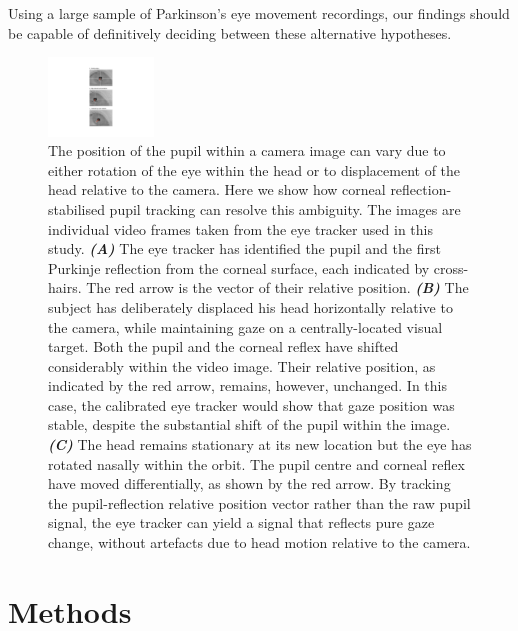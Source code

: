 \documentclass[jou,a4paper]{apa6}
\begin{document}
Using a large sample of Parkinson's eye movement recordings, our findings should be capable of definitively deciding between these alternative hypotheses.

\begin{figure}[htbp]
\begin{center}
\includegraphics [width=0.25\textwidth]{Figures/Figure_1_Explanatory}
\caption{The position of the pupil within a camera image can vary due to either rotation of the eye within the head or to displacement of the head relative to the camera. Here we show how corneal reflection-stabilised pupil tracking can resolve this ambiguity. The images are individual video frames taken from the eye tracker used in this study. \textbf{\textit{(A)}} The eye tracker has identified the pupil and the first Purkinje reflection from the corneal surface, each indicated by cross-hairs. The red arrow is the vector of their relative position. \textbf{\textit{(B)}} The subject has deliberately displaced his head horizontally relative to the camera, while maintaining gaze on a centrally-located visual target. Both the pupil and the corneal reflex have shifted considerably within the video image. Their relative position, as indicated by the red arrow, remains, however, unchanged. In this case, the calibrated eye tracker would show that gaze position was stable, despite the substantial shift of the pupil within the image. \textbf{\textit{(C)}} The head remains stationary at its new location but the eye has rotated nasally within the orbit. The pupil centre and corneal reflex have moved differentially, as shown by the red arrow. By tracking the pupil-reflection relative position vector rather than the raw pupil signal, the eye tracker can yield a signal that reflects pure gaze change, without artefacts due to head motion relative to the camera.}
\label{fig:PCCR}
\end{center}
\end{figure}

\section{Methods}
\end{document}
